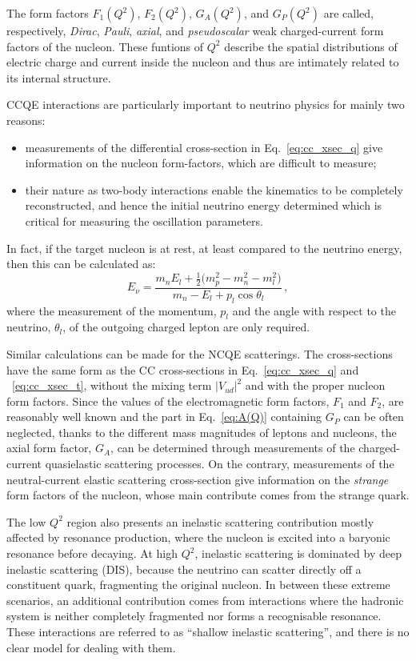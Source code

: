 The form factors $F_1(Q^2)$, $F_2(Q^2)$, $G_A(Q^2)$, and $G_P(Q^2)$ are called, respectively, \emph{Dirac}, %
\emph{Pauli}, \emph{axial}, and \emph{pseudoscalar} weak charged-current form factors of the nucleon.
These funtions of $Q^2$ describe the spatial distributions of electric charge and current inside the nucleon %
and thus are intimately related to its internal structure.

CCQE interactions are particularly important to neutrino physics for mainly two reasons:
\begin{itemize}
	\item measurements of the differential cross-section in Eq.~\ref{eq:cc_xsec_q} give information on the %
		nucleon form-factors, which are difficult to measure; 
	\item their nature as two-body interactions enable the kinematics to be completely reconstructed, %
		and hence the initial neutrino energy determined which is critical for measuring the oscillation parameters.
\end{itemize}

In fact, if the target nucleon is at rest, at least compared to the neutrino energy, %
then this can be calculated as:
\begin{equation}
	E_\nu = \frac{m_n E_l + \frac{1}{2}\big ( m_p^2-m_n^2-m_l^2)}{m_n - E_l+p_l \cos \theta_l}\,,
\end{equation}
where the measurement of the momentum, $p_l$ and the angle with respect to the neutrino, $\theta_l$, of the %
outgoing charged lepton are only required.

Similar calculations can be made for the NCQE scatterings.
The cross-sections have the same form as the CC cross-sections in Eq.~\ref{eq:cc_xsec_q} and ~\ref{eq:cc_xsec_t}, %
without the mixing term $|V_{ud}|^2$ and with the proper nucleon form factors.
Since the values of the electromagnetic form factors, $F_1$ and $F_2$, are reasonably well known and the part %
in Eq.~\ref{eq:A(Q)} containing $G_P$ can be often neglected, thanks to the different mass magnitudes of %
leptons and nucleons, the axial form factor, $G_A$, can be determined through measurements of the charged-current %
quasielastic scattering processes.
On the contrary, measurements of the neutral-current elastic scattering cross-section give information %
on the \emph{strange} form factors of the nucleon, whose main contribute comes from the strange quark.


The low $Q^2$ region also presents an inelastic scattering contribution mostly affected by resonance production, %
where the nucleon is excited into a baryonic resonance before decaying.
At high $Q^2$, inelastic scattering is dominated by deep inelastic scattering (DIS), because the neutrino can scatter %
directly off a constituent quark, fragmenting the original nucleon.
In between these extreme scenarios, an additional contribution comes from interactions where the hadronic %
system is neither completely fragmented nor forms a recognisable resonance.
These interactions are referred to as ``shallow inelastic scattering'', and there is no clear model for dealing %
with them.
